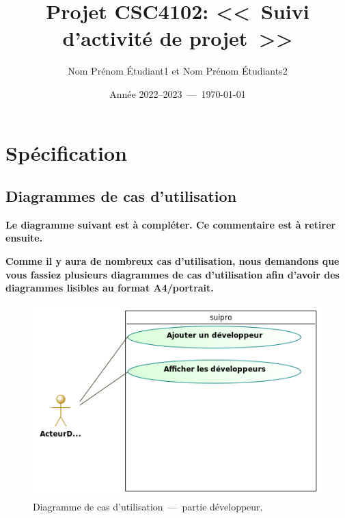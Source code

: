 \documentclass[11pt,article]{article}
\begin{document}
\title{Projet CSC4102: <<~Suivi d'activité de projet~>>}
\author{Nom Prénom Étudiant1 et Nom Prénom Étudiants2}
\date{Année 2022--2023~---~\today}
\maketitle

\vfill

\tableofcontents

\newpage

\section{Spécification}

\subsection{Diagrammes de cas d'utilisation}

{\noindent\color{red}\textbf{Le diagramme suivant est à compléter. Ce
    commentaire est à retirer ensuite.}}

{\noindent\color{red}\textbf{Comme il y aura de nombreux cas
    d'utilisation, nous demandons que vous fassiez plusieurs
    diagrammes de cas d'utilisation afin d'avoir des diagrammes
    lisibles au format A4/portrait.}}

\begin{figure}[!ht]
\begin{center}
\includegraphics[scale=0.6]{Diagrammes/suipro_uml_diag_cas_utilisation_partie_developpeur}
\caption{Diagramme de cas d'utilisation~---~partie développeur.}
\end{center}
\label{usecase_modelio}
\end{figure}
\end{document}
